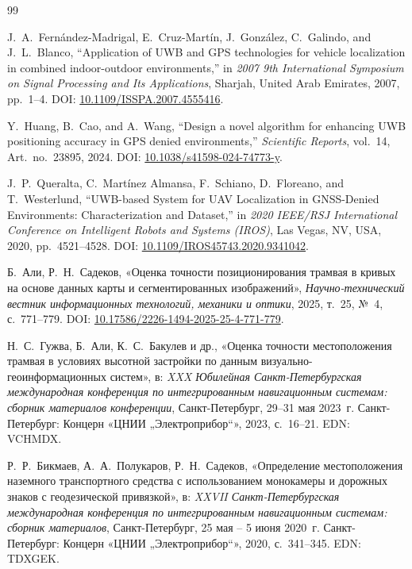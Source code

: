 \documentclass{misisarticle}
\begin{document}
\begin{thebibliography}{99}

J.~A.~Fernández-Madrigal, E.~Cruz-Martín, J.~González, C.~Galindo, and J.~L.~Blanco,
“Application of UWB and GPS technologies for vehicle localization in combined indoor-outdoor environments,”
in \textit{2007 9th International Symposium on Signal Processing and Its Applications},
Sharjah, United Arab Emirates, 2007, pp.~1--4.
DOI: \href{https://doi.org/10.1109/ISSPA.2007.4555416}{10.1109/ISSPA.2007.4555416}.

Y.~Huang, B.~Cao, and A.~Wang,
“Design a novel algorithm for enhancing UWB positioning accuracy in GPS denied environments,”
\textit{Scientific Reports}, vol.~14, Art.~no.~23895, 2024.
DOI: \href{https://doi.org/10.1038/s41598-024-74773-y}{10.1038/s41598-024-74773-y}.

J.~P.~Queralta, C.~Martínez Almansa, F.~Schiano, D.~Floreano, and T.~Westerlund,
“UWB-based System for UAV Localization in GNSS-Denied Environments: Characterization and Dataset,”
in \textit{2020 IEEE/RSJ International Conference on Intelligent Robots and Systems (IROS)},
Las Vegas, NV, USA, 2020, pp.~4521--4528.
DOI: \href{https://doi.org/10.1109/IROS45743.2020.9341042}{10.1109/IROS45743.2020.9341042}.

Б.~Али, Р.~Н.~Садеков,
«Оценка точности позиционирования трамвая в кривых на основе данных карты и сегментированных изображений»,
\textit{Научно-технический вестник информационных технологий, механики и оптики},
2025, т.~25, №~4, с.~771--779.
DOI: \href{https://doi.org/10.17586/2226-1494-2025-25-4-771-779}{10.17586/2226-1494-2025-25-4-771-779}.

Н.~С.~Гужва, Б.~Али, К.~С.~Бакулев и др.,
«Оценка точности местоположения трамвая в условиях высотной застройки по данным визуально-геоинформационных систем»,
в: \textit{XXX Юбилейная Санкт-Петербургская международная конференция по интегрированным навигационным системам: сборник материалов конференции},
Санкт-Петербург, 29--31 мая 2023~г.
Санкт-Петербург: Концерн «ЦНИИ „Электроприбор“», 2023, с.~16--21.
EDN: VCHMDX.

Р.~Р.~Бикмаев, А.~А.~Полукаров, Р.~Н.~Садеков,
«Определение местоположения наземного транспортного средства с использованием монокамеры и дорожных знаков с геодезической привязкой»,
в: \textit{XXVII Санкт-Петербургская международная конференция по интегрированным навигационным системам: сборник материалов},
Санкт-Петербург, 25 мая -- 5 июня 2020~г.
Санкт-Петербург: Концерн «ЦНИИ „Электроприбор“», 2020, с.~341--345.
EDN: TDXGEK.




\end{thebibliography}
\end{document}
